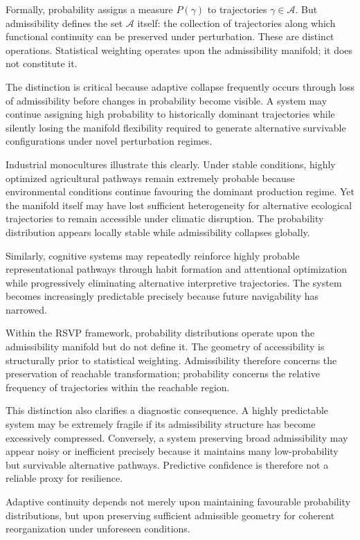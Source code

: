 \documentclass[11pt,a4paper]{article}
\newcommand{\Aspace}{\mathcal{A}}
\begin{document}
Formally, probability assigns a measure $P(\gamma)$ to trajectories $\gamma \in \Aspace$. But admissibility defines the set $\Aspace$ itself: the collection of trajectories along which functional continuity can be preserved under perturbation. These are distinct operations. Statistical weighting operates upon the admissibility manifold; it does not constitute it.

The distinction is critical because adaptive collapse frequently occurs through loss of admissibility before changes in probability become visible. A system may continue assigning high probability to historically dominant trajectories while silently losing the manifold flexibility required to generate alternative survivable configurations under novel perturbation regimes.

Industrial monocultures illustrate this clearly. Under stable conditions, highly optimized agricultural pathways remain extremely probable because environmental conditions continue favouring the dominant production regime. Yet the manifold itself may have lost sufficient heterogeneity for alternative ecological trajectories to remain accessible under climatic disruption. The probability distribution appears locally stable while admissibility collapses globally.

Similarly, cognitive systems may repeatedly reinforce highly probable representational pathways through habit formation and attentional optimization while progressively eliminating alternative interpretive trajectories. The system becomes increasingly predictable precisely because future navigability has narrowed.

Within the RSVP framework, probability distributions operate upon the admissibility manifold but do not define it. The geometry of accessibility is structurally prior to statistical weighting. Admissibility therefore concerns the preservation of reachable transformation; probability concerns the relative frequency of trajectories within the reachable region.

This distinction also clarifies a diagnostic consequence. A highly predictable system may be extremely fragile if its admissibility structure has become excessively compressed. Conversely, a system preserving broad admissibility may appear noisy or inefficient precisely because it maintains many low-probability but survivable alternative pathways. Predictive confidence is therefore not a reliable proxy for resilience.

Adaptive continuity depends not merely upon maintaining favourable probability distributions, but upon preserving sufficient admissible geometry for coherent reorganization under unforeseen conditions.
\end{document}
